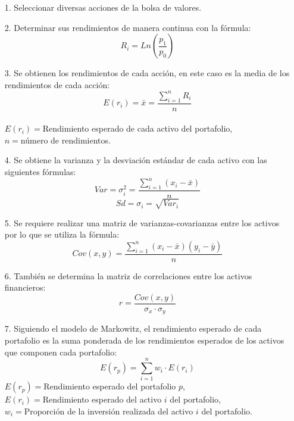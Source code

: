 \documentclass[12pt]{book} %
\begin{document}
\begin{itemize}
\item[1.] Seleccionar diversas acciones de la bolsa de valores.
\item[2.] Determinar sus rendimientos de manera continua con la fórmula:
\begin{equation} \label{eq1}
R_i=Ln \left (\frac{p_1}{p_0}\right )
\end{equation}
\item[3.] Se obtienen los rendimientos de cada acción, en este caso es la media de los rendimientos de cada acción:
\begin{equation} \label{eq2}
E(r_i)=\bar{x}=\frac{\sum\limits_{i=1}^nR_i}{n}
\end{equation}
\\
$E(r_i)=$Rendimiento esperado de cada activo del portafolio, \\
$n=$número de rendimientos.
\item[4.] Se obtiene la varianza y la desviación estándar de cada activo con las siguientes fórmulas: 
\begin{equation}\label{eq3}
Var=\sigma_i^{2}=\frac{\sum\limits_{i=1}^n (x_i-\bar{x})}{n}
\end{equation}
\begin{equation}\label{eq4}
Sd=\sigma_i=\sqrt{Var_i}
\end{equation}
\item[5.] Se requiere realizar una matriz de varianzas-covarianzas entre los activos por lo que se utiliza la fórmula:
\begin{equation}\label{eq5}
Cov(x,y)=\frac{\sum\limits_{i=1}^n (x_i-\bar{x})(y_i-\bar{y})}{n}
\end{equation}
\item[6.] También se determina la matriz de correlaciones entre los activos financieros:
\begin{equation}\label{eq6}
r=\frac{Cov(x,y)}{\sigma_x \cdot \sigma_y}
\end{equation}
\item[7.] Siguiendo el modelo de Markowitz, el rendimiento esperado de cada portafolio es la suma ponderada de los rendimientos esperados de los activos que componen cada portafolio:
\begin{equation}\label{eq7}
E(r_p)=\sum_{i=1}^{n}w_i\cdot E(r_i)
\end{equation}
$E(r_p)=$Rendimiento esperado del portafolio $p$,\\
$E(r_i)=$Rendimiento esperado del activo $i$ del portafolio,\\
$w_i=$Proporción de la inversión realizada del activo $i$ del portafolio.\\


\end{itemize}
\end{document}
